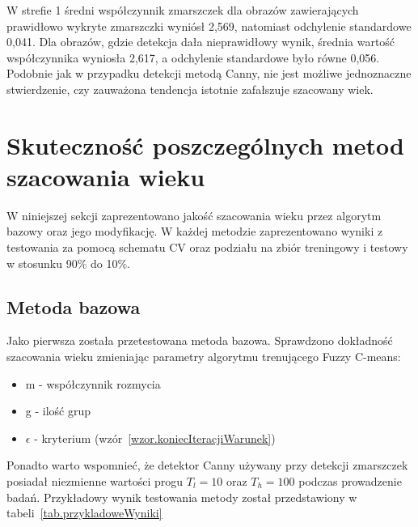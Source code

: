 \documentclass[a4paper,twoside,12pt]{book}
\begin{document}
    W strefie 1 średni współczynnik zmarszczek dla obrazów zawierających prawidłowo wykryte zmarszczki wyniósł 2,569,
    natomiast odchylenie standardowe 0,041. Dla obrazów, gdzie detekcja dała nieprawidłowy wynik, średnia wartość
    współczynnika wyniosła 2,617, a odchylenie standardowe było równe 0,056.
    Podobnie jak w przypadku detekcji metodą Canny, nie jest możliwe jednoznaczne stwierdzenie, czy zauważona
    tendencja istotnie zafałszuje szacowany wiek.
    \section{Skuteczność poszczególnych metod szacowania wieku}\label{sec:skuteczność-poszczególnych-metod-szacowania-wieku}
    W niniejszej sekcji zaprezentowano jakość szacowania wieku przez algorytm bazowy oraz jego modyfikację. W każdej
    metodzie zaprezentowano wyniki z testowania za pomocą schematu CV oraz podziału na zbiór treningowy i testowy w
    stosunku 90\% do 10\%.
    \subsection{Metoda bazowa}\label{subsec:metoda-bazowa}
    Jako pierwsza została przetestowana metoda bazowa.
    Sprawdzono dokładność szacowania wieku zmieniając parametry algorytmu trenującego Fuzzy C-means:
    \begin{itemize}
        \item m - współczynnik rozmycia
        \item g - ilość grup
        \item $\epsilon$ - kryterium (wzór~\ref{wzor.koniecIteracjiWarunek})
    \end{itemize}
    Ponadto warto wspomnieć, że detektor Canny używany przy detekcji zmarszczek posiadał niezmienne wartości progu
    $T_{l} = 10$ oraz $T_{h} = 100$ podczas prowadzenie badań.
    Przykładowy wynik testowania metody został przedstawiony w tabeli~\ref{tab.przykladoweWyniki}
\end{document}
